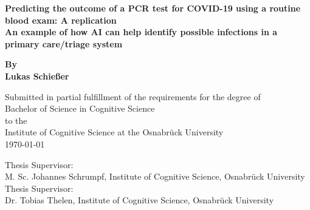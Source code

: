 \begin{titlepage}
	\begin{center}
		\vspace*{1cm}
		\Huge
		\textbf{Predicting the outcome of a PCR test for COVID-19 using a 
routine blood exam: A replication \\} 
		\vspace{0.5cm}
		\Large
		\textbf{An example of how AI can help identify possible infections in a 
primary care/triage system}
		
		\vspace{1cm}
		
		\textbf{By \\ Lukas Schießer}
		
		\vspace{1cm}
		\small
		Submitted in partial fulfillment of the requirements for the degree of \\
		Bachelor of Science in Cognitive Science \\ to the \\
		Institute of Cognitive Science at the Osnabrück University\\
		\today
		
		\vfill
		\vspace{1cm}
		Thesis Supervisor:\\ M. Sc. Johannes Schrumpf, Institute of Cognitive 
Science, Osnabrück University \\
		Thesis Supervisor:\\   Dr. Tobias Thelen, Institute of Cognitive 
Science, Osnabrück University
		
		
		
	\end{center}
\end{titlepage}

